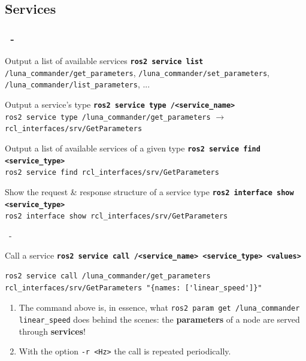\documentclass{beamer}
\begin{document}
\subsection{Services}
\begin{frame}{}
    \frametitle{\insertsection \ - \insertsubsection}
    \begin{block}{Output a list of available services}
        \centering
        \normalsize \textbf{\texttt{ros2 service list}} \\
        \small \texttt{/luna\_commander/get\_parameters}, \texttt{/luna\_commander/set\_parameters}, \texttt{/luna\_commander/list\_parameters}, ...
    \end{block}
    \begin{block}{Output a service's type}
        \centering
        \normalsize \textbf{\texttt{ros2 service type /<service\_name>}} \\
        \footnotesize \texttt{ros2 service type /luna\_commander/get\_parameters} $\rightarrow$ \texttt{rcl\_interfaces/srv/GetParameters}
    \end{block}
    \begin{block}{Output a list of available services of a given type}
        \centering
        \normalsize \textbf{\texttt{ros2 service find <service\_type>}} \\
        \small \texttt{ros2 service find rcl\_interfaces/srv/GetParameters}
    \end{block}
    \begin{block}{Show the request \& response structure of a service type}
        \centering
        \normalsize \textbf{\texttt{ros2 interface show <service\_type>}} \\
        \small \texttt{ros2 interface show rcl\_interfaces/srv/GetParameters}
    \end{block}
\end{frame}

\begin{frame}[fragile]{\insertsection \ - \insertsubsection}
    \begin{block}{Call a service}
        \centering
        \normalsize \textbf{\texttt{ros2 service call /<service\_name> <service\_type> <values>}}
    \end{block}
    \begin{lstlisting}
ros2 service call /luna_commander/get_parameters rcl_interfaces/srv/GetParameters "{names: ['linear_speed']}"
    \end{lstlisting}
    \bigskip
    \begin{enumerate}
        \item The command above is, in essence, what \texttt{ros2 param get /luna\_commander linear\_speed} does behind the scenes: the \textbf{parameters} of a node are served through \textbf{services}!
        \item With the option \texttt{-r <Hz>} the call is repeated periodically.
    \end{enumerate}
\end{frame}
\end{document}
